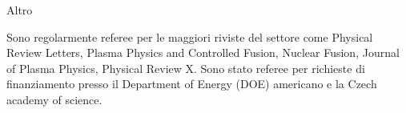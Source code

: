 \begin{cvblock}{Altro}
\end{cvblock}
Sono regolarmente referee per le maggiori riviste del settore come Physical Review
Letters, Plasma Physics and Controlled Fusion, Nuclear Fusion, Journal
of Plasma Physics, Physical Review X.  Sono stato referee per
richieste di finanziamento presso il Department of Energy (DOE)
americano e la Czech academy of science.\\

